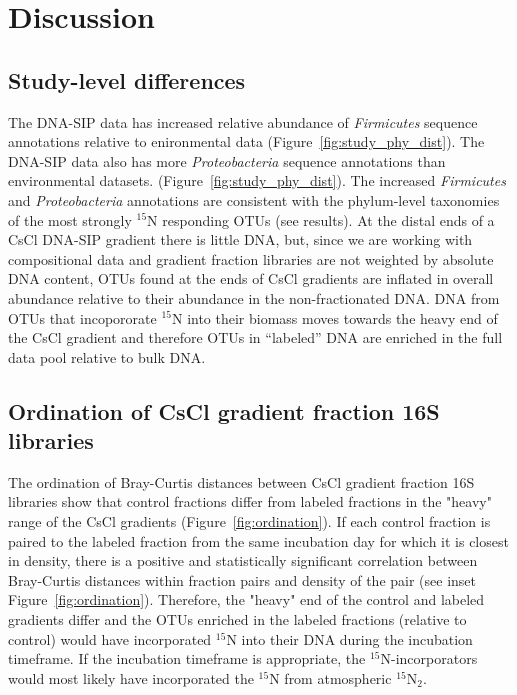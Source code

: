 \section{Discussion}
\subsection{Study-level differences}
The DNA-SIP data has increased relative abundance of \textit{Firmicutes}
sequence annotations relative to enironmental data
(Figure~\ref{fig:study_phy_dist}). The DNA-SIP data also has more
\textit{Proteobacteria} sequence annotations than environmental datasets.
(Figure~\ref{fig:study_phy_dist}).  The increased \textit{Firmicutes} and
\textit{Proteobacteria} annotations are consistent with the phylum-level
taxonomies of the most strongly $^{15}$N responding OTUs (see results). At the
distal ends of a CsCl DNA-SIP gradient there is little DNA, but, since we are
working with compositional data and gradient fraction libraries are not
weighted by absolute DNA content, OTUs found at the ends of CsCl gradients are
inflated in overall abundance relative to their abundance in the
non-fractionated DNA. DNA from OTUs that incopororate $^{15}$N into their
biomass moves towards the heavy end of the CsCl gradient and therefore OTUs in
``labeled'' DNA are enriched in the full data pool relative to bulk DNA. 

\subsection{Ordination of CsCl gradient fraction 16S libraries} The
ordination of Bray-Curtis distances between CsCl gradient fraction 16S
libraries show that control fractions differ from labeled fractions in the
"heavy" range of the CsCl gradients (Figure~\ref{fig:ordination}). If each
control fraction is paired to the labeled fraction from the same incubation day
for which it is closest in density, there is a positive and statistically
significant correlation between Bray-Curtis distances within fraction pairs
and density of the pair (see inset Figure~\ref{fig:ordination}).  Therefore,
the "heavy" end of the control and labeled gradients differ and the OTUs
enriched in the labeled fractions (relative to control) would have
incorporated $^{15}$N into their DNA during the incubation timeframe. If the
incubation timeframe is appropriate, the $^{15}$N-incorporators would most
likely have incorporated the $^{15}$N from atmospheric $^{15}$N$_{2}$.     

